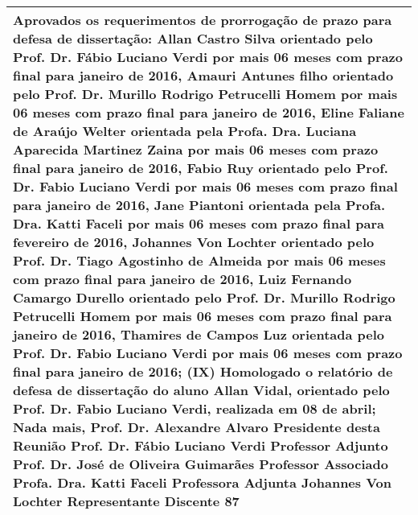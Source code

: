\begin{longtable}{|p{17.5cm}|}
 \\ \hline 
Aprovados os requerimentos de prorrogação de prazo para defesa de dissertação: Allan Castro Silva orientado pelo Prof. Dr. Fábio Luciano Verdi por mais 06 meses com prazo final para janeiro de 2016, Amauri Antunes filho orientado pelo Prof. Dr. Murillo Rodrigo Petrucelli Homem por mais 06 meses com prazo final para janeiro de 2016, Eline Faliane de Araújo Welter orientada pela Profa. Dra. Luciana Aparecida Martinez Zaina por mais 06 meses com prazo final para janeiro de 2016, Fabio Ruy orientado pelo Prof. Dr. Fabio Luciano Verdi por mais 06 meses com prazo final para janeiro de 2016, Jane Piantoni orientada pela Profa. Dra. Katti Faceli por mais 06 meses com prazo final para fevereiro de 2016, Johannes Von Lochter orientado pelo Prof. Dr. Tiago Agostinho de Almeida por mais 06 meses com prazo final para janeiro de 2016, Luiz Fernando Camargo Durello orientado pelo Prof. Dr. Murillo Rodrigo Petrucelli Homem por mais 06 meses com prazo final para janeiro de 2016, Thamires de Campos Luz orientada pelo Prof. Dr. Fabio Luciano Verdi por mais 06 meses com prazo final para janeiro de 2016; (IX) Homologado o relatório de defesa de dissertação do aluno Allan Vidal, orientado pelo Prof. Dr. Fabio Luciano Verdi, realizada em 08 de abril; Nada mais, Prof. Dr. Alexandre Alvaro Presidente desta Reunião Prof. Dr. Fábio Luciano Verdi Professor Adjunto Prof. Dr. José de Oliveira Guimarães Professor Associado Profa. Dra. Katti Faceli Professora Adjunta Johannes Von Lochter Representante Discente 87

 \\ \hline 

\end{longtable} 








